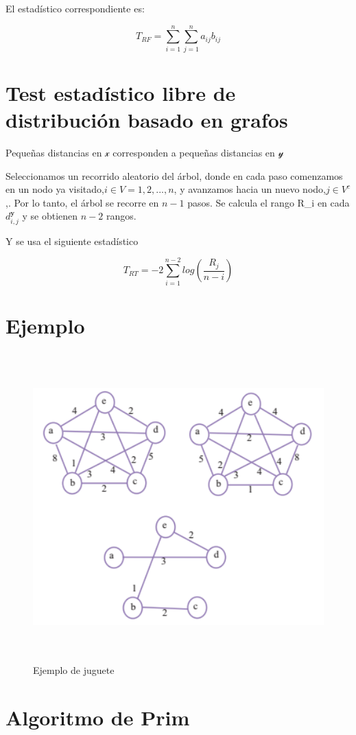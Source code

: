 \documentclass[]{book}
\begin{document}
El estadístico correspondiente es:

\[T_{RF} = \displaystyle \sum_{i=1}^n \sum_{j=1}^n a_{ij}b_{ij}\]

\section{Test estadístico libre de distribución basado en
grafos}\label{test-estadistico-libre-de-distribucion-basado-en-grafos}

Pequeñas distancias en \(\mathcal{x}\) corresponden a pequeñas
distancias en \(\mathcal{y}\)

Seleccionamos un recorrido aleatorio del árbol, donde en cada paso
comenzamos en un nodo ya visitado,\(i \in V= {1,2,...,n}\), y avanzamos
hacia un nuevo nodo,\(j \in V^c\),. Por lo tanto, el árbol se recorre en
\(n-1\) pasos. Se calcula el rango R\_i en cada \(d_{i,j}^{\mathbf{y}}\)
y se obtienen \(n-2\) rangos.

Y se usa el siguiente estadístico

\[T_{RT} =  -2 \displaystyle \sum_{i=1}^{n-2} log(\dfrac{R_j}{n-i})\]

\section{Ejemplo}\label{ejemplo}

\begin{figure}

{\centering \includegraphics[width=500,height=450]{test6} 

}

\caption{Ejemplo de juguete}\label{fig:unnamed-chunk-7}
\end{figure}

\section{Algoritmo de Prim}\label{algoritmo-de-prim}
\end{document}
